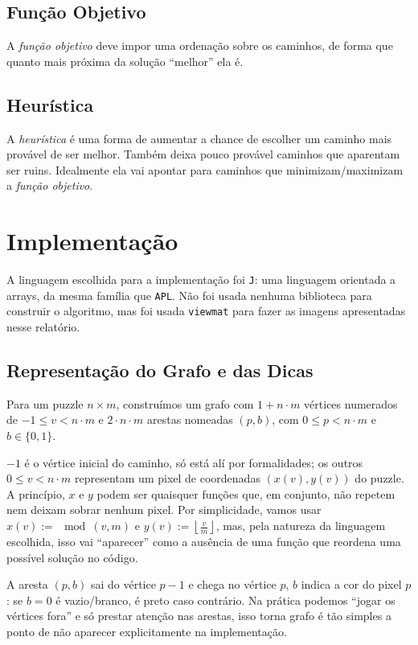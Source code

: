 \documentclass{article}
\newcommand{\apl}{\texttt{APL}}
\newcommand{\lang}{\texttt{J}}
\newcommand{\inlcode}{\texttt}
\begin{document}
\subsection{Função Objetivo}
A \emph{função objetivo} deve impor
uma ordenação sobre os caminhos,
de forma que quanto mais próxima da solução
``melhor'' ela é.

\subsection{Heurística}
A \emph{heurística} é uma forma de aumentar a chance de escolher
um caminho mais provável de ser melhor.
Também deixa pouco provável
caminhos que aparentam ser ruins.
Idealmente ela vai apontar para caminhos que
minimizam/maximizam a \emph{função objetivo}.

\section{Implementação}

A linguagem escolhida para a implementação foi \lang{}:
uma linguagem orientada a arrays,
da mesma família que \apl{}.
Não foi usada nenhuma biblioteca para construir o algoritmo,
mas foi usada \inlcode{viewmat} para fazer as imagens
apresentadas nesse relatório.

\subsection{Representação do Grafo e das Dicas}
Para um puzzle \(n \times m\),
construímos um grafo com \(1 + n \cdot m\) vértices
numerados de \(-1 \le v < n \cdot m\) e
\(2 \cdot n \cdot m\) arestas nomeadas \((p, b)\),
com \(0 \le p < n \cdot m\) e \(b \in \{0, 1\}\).

\(-1\) é o vértice inicial do caminho,
só está alí por formalidades;
os outros \(0 \le v < n \cdot m\)
representam um pixel de coordenadas \((x(v), y(v))\) do puzzle.
A princípio, \(x\) e \(y\) podem ser quaisquer
funções que, em conjunto,
não repetem nem deixam sobrar nenhum pixel.
Por simplicidade, vamos usar
\(x(v) := \!\!\!\mod\!\!(v, m)\) e
\(y(v) := \left\lfloor\frac{v}{m}\right\rfloor\),
mas, pela natureza da linguagem escolhida,
isso vai ``aparecer'' como a ausência de uma função
que reordena uma possível solução no código.

A aresta \((p, b)\) sai do vértice \(p-1\) e
chega no vértice \(p\),
\(b\) indica a cor do pixel \(p\):
se \(b = 0\) é vazio/branco,
é preto caso contrário.
Na prática podemos ``jogar os vértices fora''
e só prestar atenção nas arestas,
isso torna grafo é tão simples
a ponto de não aparecer explicitamente na implementação.
\end{document}
